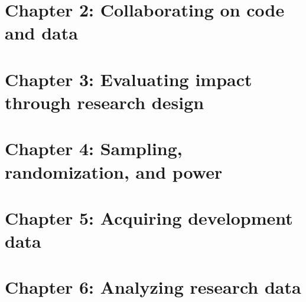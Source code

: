 \chapter{Chapter 2: Collaborating on code and data}
\label{ch:2}




\chapter{Chapter 3: Evaluating impact through research design}
\label{ch:3}




\chapter{Chapter 4: Sampling, randomization, and power}
\label{ch:4}




\chapter{Chapter 5: Acquiring development data}
\label{ch:5}




\chapter{Chapter 6: Analyzing research data}
\label{ch:6}



